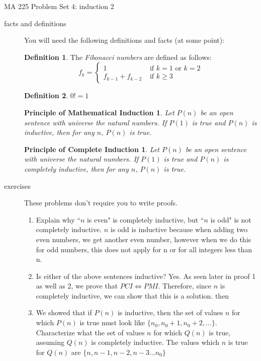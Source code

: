 \documentclass[10pt]{letter}
\newtheorem*{pmi}{Principle of Mathematical Induction}
\newtheorem*{pci}{Principle of Complete Induction}
\theoremstyle{definition}
\newtheorem{defn}{Definition}
\begin{document}
\pagestyle{empty}

{\Large MA 225 Problem Set 4: induction 2}\\



\begin{description}
	\item[facts and definitions] You will need the following definitions and facts (at some point):
	
	\begin{defn}
	The {\em Fibonacci numbers} are defined as follows:
		\begin{equation*}
			f_k=\begin{cases}1&\text{ if }k=1\text{ or }k=2\\f_{k-1}+f_{k-2}&\text{ if }k\geq 3\end{cases}
		\end{equation*}
\end{defn}

\begin{defn}
	$0!=1$
\end{defn}

\begin{pmi}
	Let $P(n)$ be an open sentence with universe the natural numbers. If $P(1)$ is true and $P(n)$ is inductive, then for any $n$, $P(n)$ is true.
\end{pmi}

\begin{pci}
	Let $P(n)$ be an open sentence with universe the natural numbers. If $P(1)$ is true and $P(n)$ is completely inductive, then for any $n$, $P(n)$ is true.
\end{pci}\bigskip

	\item[exercises]  These problems don't require you to write proofs.
		\begin{enumerate}
			\item Explain why ``$n$ is even" is completely inductive, but ``$n$ is odd" is not completely inductive. $n$ is odd is inductive because when adding two even numbers, we get another even number, however when we do this for odd numbers, this does not apply for n or for all integers less than n.
			\item Is either of the above sentences inductive? Yes. As seen later in proof 1 as well as 2, we prove that $PCI \Leftrightarrow PMI$. Therefore, since $n$ is completely inductive, we can show that this is a solution. then 
			\item We showed that if $P(n)$ is inductive, then the set of values $n$ for which $P(n)$ is true must look like $\{n_0,n_0+1,n_0+2,\ldots\}$. Characterize what the set of values $n$ for which $Q(n)$ is true, assuming $Q(n)$ is completely inductive. The values which $n$ is true for $Q(n)$ are $\{n,n-1,n-2,n-3\ldots n_0\}$
		\end{enumerate}\bigskip


\end{description}
\end{document}
